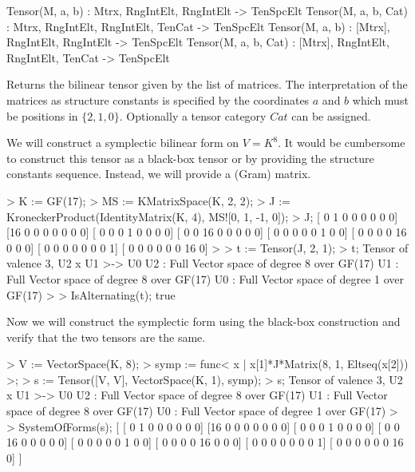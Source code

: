 \begin{intrinsics}
Tensor(M, a, b) : Mtrx, RngIntElt, RngIntElt -> TenSpcElt
Tensor(M, a, b, Cat) : Mtrx, RngIntElt, RngIntElt, TenCat -> TenSpcElt
Tensor(M, a, b) : [Mtrx], RngIntElt, RngIntElt -> TenSpcElt
Tensor(M, a, b, Cat) : [Mtrx], RngIntElt, RngIntElt, TenCat -> TenSpcElt
\end{intrinsics}

Returns the bilinear tensor given by the list of matrices.  The interpretation
of the matrices as structure constants is specified by the coordinates $a$ and $b$
which must be positions in $\{2,1,0\}$.  
Optionally a tensor category $Cat$ can be assigned.


\begin{example}[SymplecticForm]

We will construct a symplectic bilinear form on $V=K^8$. 
It would be cumbersome to construct this tensor as a black-box tensor or by providing the structure constants sequence. 
Instead, we will provide a (Gram) matrix. 
\begin{code}
> K := GF(17);
> MS := KMatrixSpace(K, 2, 2);
> J := KroneckerProduct(IdentityMatrix(K, 4), MS![0, 1, -1, 0]);
> J;
[ 0  1  0  0  0  0  0  0]
[16  0  0  0  0  0  0  0]
[ 0  0  0  1  0  0  0  0]
[ 0  0 16  0  0  0  0  0]
[ 0  0  0  0  0  1  0  0]
[ 0  0  0  0 16  0  0  0]
[ 0  0  0  0  0  0  0  1]
[ 0  0  0  0  0  0 16  0]
> 
> t := Tensor(J, 2, 1);
> t;
Tensor of valence 3, U2 x U1 >-> U0
U2 : Full Vector space of degree 8 over GF(17)
U1 : Full Vector space of degree 8 over GF(17)
U0 : Full Vector space of degree 1 over GF(17)
> 
> IsAlternating(t);
true
\end{code}

Now we will construct the symplectic form using the black-box construction and verify that the two tensors are the same. 
\begin{code}
> V := VectorSpace(K, 8);
> symp := func< x | x[1]*J*Matrix(8, 1, Eltseq(x[2])) >;
> s := Tensor([V, V], VectorSpace(K, 1), symp);
> s;
Tensor of valence 3, U2 x U1 >-> U0
U2 : Full Vector space of degree 8 over GF(17)
U1 : Full Vector space of degree 8 over GF(17)
U0 : Full Vector space of degree 1 over GF(17)
> 
> SystemOfForms(s);
[
    [ 0  1  0  0  0  0  0  0]
    [16  0  0  0  0  0  0  0]
    [ 0  0  0  1  0  0  0  0]
    [ 0  0 16  0  0  0  0  0]
    [ 0  0  0  0  0  1  0  0]
    [ 0  0  0  0 16  0  0  0]
    [ 0  0  0  0  0  0  0  1]
    [ 0  0  0  0  0  0 16  0]
]
\end{code}
\end{example}

